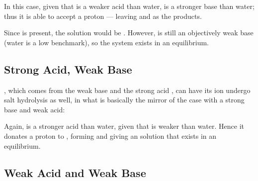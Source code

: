 
			In this case, given that  is a weaker acid than water,  is a stronger base than water; thus it is
			able to accept a proton --- leaving  and  as the products.

			Since  is present, the solution would be . However,  is still an objectively weak base
			(water is a low benchmark), so the system exists in an equilibrium.



		\subsection{Strong Acid, Weak Base}
			, which comes from the weak base  and the strong acid , can have its  ion undergo
			salt hydrolysis as well, in what is basically the mirror of the case with a strong base and weak acid:


			Again,  is a stronger acid than water, given that  is weaker than water. Hence it donates a proton to ,
			forming  and giving an  solution that exists in an equilibrium.



		\pagebreak
		\subsection{Weak Acid and Weak Base}

